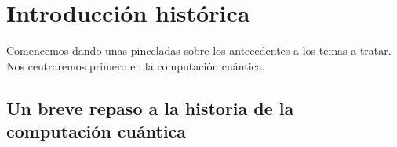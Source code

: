 \chapter{Introducción histórica}

Comencemos dando unas pinceladas sobre los antecedentes a los temas a tratar. Nos centraremos primero en la computación cuántica.

\section{Un breve repaso a la historia de la computación cuántica}

